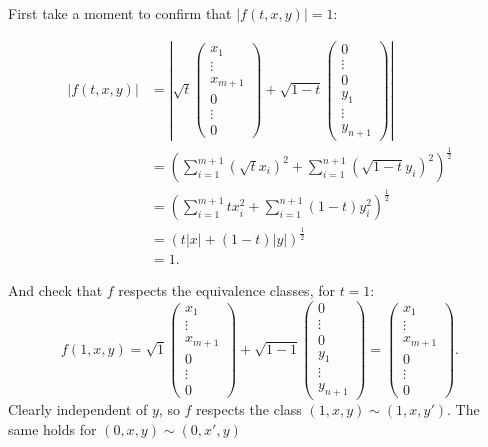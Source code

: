 \documentclass{article}
\begin{document}
First take a moment to confirm that $|f(t,x,y)|=1$:

\begin{align*}
    |f(t,x,y)|&= \left|  
\sqrt{t} \begin{pmatrix} x_1\\\vdots \\x_{m+1}\\0\\ \vdots \\ 0 \end{pmatrix} 
+\sqrt{1-t} \begin{pmatrix} 0\\ \vdots \\ 0\\ y_1\\\vdots \\y_{n+1} \end{pmatrix} 
\right|  \\
&= \left( \sum_{i=1}^{m+1} (\sqrt{t} x_{i})^2 + \sum_{i=1}^{n+1} (\sqrt{1-t} y_{i})^2 \right)^{\frac{1}{2}}  \\
&= \left( \sum_{i=1}^{m+1} {t} x_{i}^2 + \sum_{i=1}^{n+1} (1-t) y_{i}^2 \right)^{\frac{1}{2}}  \\
&= \left(t|x|+(1-t)|y|\right)^{\frac{1}{2}}  \\
&= 1 
.\end{align*}

And check that $f$ respects the equivalence classes, for $t=1$:
\[
f(1,x,y)=
\sqrt{1} \begin{pmatrix} x_1\\\vdots \\x_{m+1}\\0\\ \vdots \\ 0 \end{pmatrix} +\sqrt{1-1} \begin{pmatrix} 0\\ \vdots \\ 0\\ y_1\\\vdots \\y_{n+1} \end{pmatrix} 
=
\begin{pmatrix} x_1\\\vdots \\x_{m+1}\\0\\ \vdots \\ 0 \end{pmatrix} 
.\] 
Clearly independent of $y$, so $f$ respects the class $(1,x,y)\sim (1,x,y')$. The same holds for $(0,x,y)\sim (0,x',y)$
\end{document}
